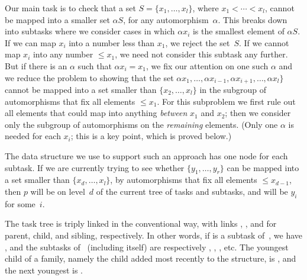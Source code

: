 Our main task is to check that a set $S=\{x_1,\ldots,x_l\}$, where
$x_1<\cdots<x_l$, cannot be mapped into a smaller set $\alpha S$, for
any automorphism~$\alpha$. This breaks down into subtasks where we consider
cases in which $\alpha x_i$ is the smallest element of $\alpha S$. If we
can map $x_i$ into a number less than $x_1$, we reject the set~$S$.
If we cannot map $x_i$ into any number $\le x_1$, we need not consider this
subtask any further. But if there is an $\alpha$ such that $\alpha x_i=x_1$,
we fix our attention on one such $\alpha$ and we reduce the problem to
showing that the set $\alpha x_1,\ldots,\alpha x_{i-1},\alpha x_{i+1},\ldots,
\alpha x_l\}$ cannot be mapped into a set smaller than $\{x_2,\ldots,x_l\}$
in the subgroup of automorphisms that fix all elements $\le x_1$.
For this subproblem we first rule out all elements that could map into anything
{\it between\/} $x_1$ and $x_2$; then we consider only the subgroup of
automorphisms on the {\it remaining\/} elements.
(Only one $\alpha$ is needed for each $x_i$; this is a key point, which
is proved below.)

\fi

The data structure we use to support such an approach has one node  for
each subtask. If we are currently trying to see whether $\{y_1,\ldots,y_r\}$
can be mapped into a set smaller than $\{x_d,\ldots,x_l\}$, by automorphisms
that fix all elements $\le x_{d-1}$, then $p$ will be on level~$d$ of the
current tree of tasks and subtasks, and  will be $y_i$ for
some~$i$.

The task tree is triply linked in the conventional way, with links
, , and  for parent, child, and sibling,
respectively.
In other words, if  is a subtask of~, we have ,
and the subtasks
of~ (including  itself) are respectively , %
,
, etc.
The youngest child of a family, namely the child
added most recently to the structure, is , and the next
youngest
is .


